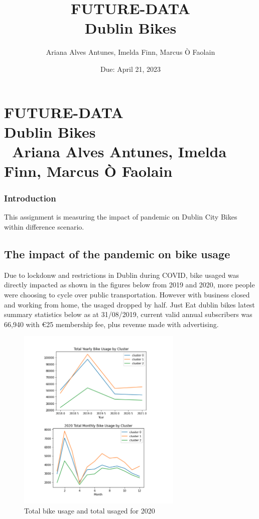 \documentclass[11pt, singlecolumn, citestyle=authoryear]{elegantbook}
\title{FUTURE-DATA\\Dublin Bikes}
\date{Due: April 21, 2023}
\author{Ariana Alves Antunes, Imelda Finn, Marcus Ò Faolain}
\begin{document}
	\mainmatter 
	
\chapter*{FUTURE-DATA\\Dublin Bikes \\\ Ariana Alves Antunes, Imelda Finn, Marcus Ò Faolain}

 	\subsection*{Introduction}
This assignment is measuring the impact of pandemic on Dublin City Bikes within difference scenario. 
	

\section {The impact of the pandemic on bike usage}
	Due to lockdonw and restrictions in Dublin during COVID,  bike usaged was directly impacted as shown in the figures below from 2019 and 2020, more people were choosing to cycle over public transportation. However with business closed and working from home, the usaged dropped by half. Just Eat dublin bikes latest summary statistics below as at 31/08/2019, current valid annual subscribers  was 66,940 with €25 membership fee, plus revenue made with advertising. 

	\begin{figure}[h!]
		\includegraphics[width=0.7\textwidth]{../graphs/usaged_total_plus2020.png}
		\caption{Total bike usage and total usaged for 2020}
		\label{fig:surface}
	\end{figure}
\end{document}
